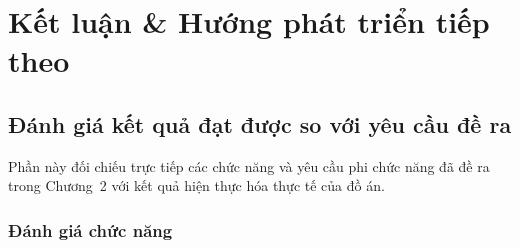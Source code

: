 \chapter{Kết luận \& Hướng phát triển tiếp theo}

\section{Đánh giá kết quả đạt được so với yêu cầu đề ra}

Phần này đối chiếu trực tiếp các chức năng và yêu cầu phi chức năng đã đề ra trong Chương~2 với kết quả hiện thực hóa thực tế của đồ án.

\subsection{Đánh giá chức năng}

